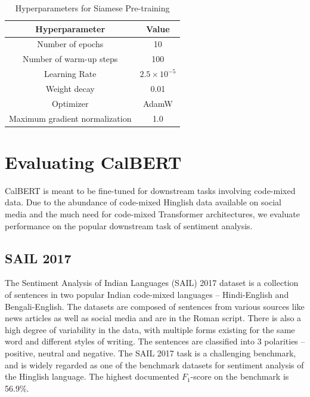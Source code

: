 \documentclass[conference]{IEEEtran}
\begin{document}
\begin{table}[htbp]
    \centering
    \caption{Hyperparameters for Siamese Pre-training}
    \label{tab:hyperparam_table}
    \begin{tabular}{|c|c|}
        \hline
        \textbf{Hyperparameter} & \textbf{Value}  \\
        \hline 
        Number of epochs & 10 \\
        \hline 
        Number of warm-up steps & 100 \\
        \hline 
        Learning Rate & $2.5 \times 10^{-5}$ \\
        \hline 
        Weight decay & 0.01 \\
        \hline 
        Optimizer & AdamW \\
        \hline 
        Maximum gradient normalization & 1.0 \\
        \hline 
    \end{tabular}
\end{table}

\section{Evaluating CalBERT}

CalBERT is meant to be fine-tuned for downstream tasks involving code-mixed data. Due to the abundance of code-mixed Hinglish data available on social media and the much need for code-mixed Transformer architectures, we evaluate performance on the popular downstream task of sentiment analysis. 

\subsection{SAIL 2017}

The Sentiment Analysis of Indian Languages (SAIL) 2017 dataset is a collection of sentences in two popular Indian code-mixed languages -- Hindi-English and Bengali-English. The datasets are composed of sentences from various sources like news articles as well as social media and are in the Roman script. There is also a high degree of variability in the data, with multiple forms existing for the same word and different styles of writing. The sentences are classified into 3 polarities -- positive, neutral and negative. The SAIL 2017 task is a challenging benchmark, and is widely regarded as one of the benchmark datasets for sentiment analysis of the Hinglish language. The highest documented $F_1$-score on the benchmark is 56.9\%.
\end{document}
